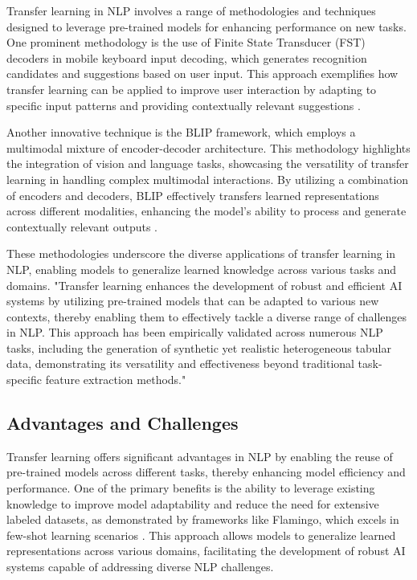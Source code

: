 Transfer learning in NLP involves a range of methodologies and techniques designed to leverage pre-trained models for enhancing performance on new tasks. One prominent methodology is the use of Finite State Transducer (FST) decoders in mobile keyboard input decoding, which generates recognition candidates and suggestions based on user input. This approach exemplifies how transfer learning can be applied to improve user interaction by adapting to specific input patterns and providing contextually relevant suggestions \cite{ouyang2017mobilekeyboardinputdecoding}.



Another innovative technique is the BLIP framework, which employs a multimodal mixture of encoder-decoder architecture. This methodology highlights the integration of vision and language tasks, showcasing the versatility of transfer learning in handling complex multimodal interactions. By utilizing a combination of encoders and decoders, BLIP effectively transfers learned representations across different modalities, enhancing the model's ability to process and generate contextually relevant outputs \cite{BLIP:Boots3}.



These methodologies underscore the diverse applications of transfer learning in NLP, enabling models to generalize learned knowledge across various tasks and domains. "Transfer learning enhances the development of robust and efficient AI systems by utilizing pre-trained models that can be adapted to various new contexts, thereby enabling them to effectively tackle a diverse range of challenges in NLP. This approach has been empirically validated across numerous NLP tasks, including the generation of synthetic yet realistic heterogeneous tabular data, demonstrating its versatility and effectiveness beyond traditional task-specific feature extraction methods." \cite{pihlgren2024systematicperformanceanalysisdeep,kasneci2023chatgpt}



\subsection{Advantages and Challenges} \label{subsec:Advantages and Challenges}



Transfer learning offers significant advantages in NLP by enabling the reuse of pre-trained models across different tasks, thereby enhancing model efficiency and performance. One of the primary benefits is the ability to leverage existing knowledge to improve model adaptability and reduce the need for extensive labeled datasets, as demonstrated by frameworks like Flamingo, which excels in few-shot learning scenarios \cite{alayrac2022flamingo}. This approach allows models to generalize learned representations across various domains, facilitating the development of robust AI systems capable of addressing diverse NLP challenges.



